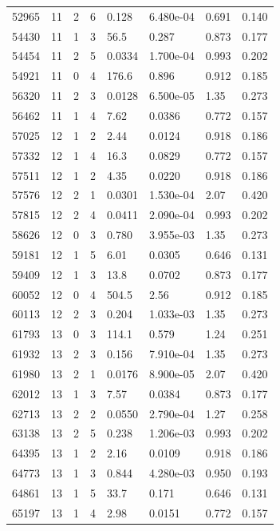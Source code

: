 \documentclass[preview]{standalone}
\begin{document}
{{{\begin{tabular}{L{1.2cm}C{1.2cm} C{0.3cm}C{0.5cm} C{1.4cm}C{1.4cm} C{1.4cm}C{1.4cm}}
  52965  &    11  & 2     &  6 &  0.128  & 6.480e-04  & 0.691 &  0.140   \\ 
  54430  &    11  & 1     &  3 &  56.5  & 0.287  & 0.873 &  0.177   \\ 
  54454  &    11  & 2     &  5 &  0.0334  & 1.700e-04  & 0.993 &  0.202   \\ 
  54921  &    11  & 0     &  4 &  176.6  & 0.896  & 0.912 &  0.185   \\ 
  56320  &    11  & 2     &  3 &  0.0128  & 6.500e-05  & 1.35 &  0.273   \\ 
  56462  &    11  & 1     &  4 &  7.62  & 0.0386  & 0.772 &  0.157   \\ 
  57025  &    12  & 1     &  2 &  2.44  & 0.0124  & 0.918 &  0.186   \\ 
  57332  &    12  & 1     &  4 &  16.3  & 0.0829  & 0.772 &  0.157   \\ 
  57511  &    12  & 1     &  2 &  4.35  & 0.0220  & 0.918 &  0.186   \\ 
  57576  &    12  & 2     &  1 &  0.0301  & 1.530e-04  & 2.07 &  0.420   \\ 
  57815  &    12  & 2     &  4 &  0.0411  & 2.090e-04  & 0.993 &  0.202   \\ 
  58626  &    12  & 0     &  3 &  0.780  & 3.955e-03  & 1.35 &  0.273   \\ 
  59181  &    12  & 1     &  5 &  6.01  & 0.0305  & 0.646 &  0.131   \\ 
  59409  &    12  & 1     &  3 &  13.8  & 0.0702  & 0.873 &  0.177   \\ 
  60052  &    12  & 0     &  4 &  504.5  & 2.56  & 0.912 &  0.185   \\ 
  60113  &    12  & 2     &  3 &  0.204  & 1.033e-03  & 1.35 &  0.273   \\ 
  61793  &    13  & 0     &  3 &  114.1  & 0.579  & 1.24 &  0.251   \\ 
  61932  &    13  & 2     &  3 &  0.156  & 7.910e-04  & 1.35 &  0.273   \\ 
  61980  &    13  & 2     &  1 &  0.0176  & 8.900e-05  & 2.07 &  0.420   \\ 
  62012  &    13  & 1     &  3 &  7.57  & 0.0384  & 0.873 &  0.177   \\ 
  62713  &    13  & 2     &  2 &  0.0550  & 2.790e-04  & 1.27 &  0.258   \\ 
  63138  &    13  & 2     &  5 &  0.238  & 1.206e-03  & 0.993 &  0.202   \\ 
  64395  &    13  & 1     &  2 &  2.16  & 0.0109  & 0.918 &  0.186   \\ 
  64773  &    13  & 1     &  3 &  0.844  & 4.280e-03  & 0.950 &  0.193   \\ 
  64861  &    13  & 1     &  5 &  33.7  & 0.171  & 0.646 &  0.131   \\ 
  65197  &    13  & 1     &  4 &  2.98  & 0.0151  & 0.772 &  0.157   \\ 
\hline 
\end{tabular} 

}}}
\end{document}
